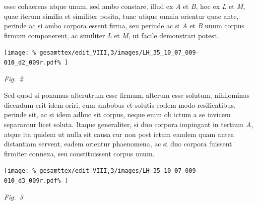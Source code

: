 %
esse cohaerens%
\protect{}
atque unum,%
\protect{}
sed ambo constare,
illud ex \textit{A} et \textit{B},
hoc ex \textit{L} et \textit{M},
quae iterum similia et similiter posita,%
\protect{}
tunc utique omnia orientur %
quae ante,
perinde ac si ambo corpora essent firma,%
\protect{}
seu perinde ac si \textit{A} et \textit{B}
unum corpus firmum componerent,
ac similiter \textit{L} et \textit{M},
ut facile demonstrari potest.
\pend%
%
%
\vspace{1.0em} %
\centerline{%
\texttt{[image: \%
gesamttex/edit\_VIII,3/images/LH\_35\_10\_07\_009-010\_d2\_009r.pdf\%
]}}
\vspace{0.5em}
\centerline{%
\lbrack\textit{Fig.~2}\rbrack%
\label{LH_35_10_07_009r_Fig.2}%
}
\vspace{1.0em}
%
\pstart%
Sed quod si ponamus
alterutrum esse firmum,%
\protect{}
alterum esse solutum,%
\protect{}
nihilominus dicendum erit
idem oriri,
cum ambobus et solutis
eodem modo resilientibus,%
\protect{}
perinde sit,
ac si idem adhuc sit corpus,
neque enim ob ictum%
\protect{}
a se invicem separantur licet soluta.%
\protect{}
Itaque generaliter,
si duo corpora
%
%
impingant in tertium \textit{A},%
\protect{}
atque ita quidem ut nulla sit causa%
\protect{}
cur non post ictum%
\protect{}
eandem quam antea distantiam servent,%
\protect{}%
\protect{}
eadem orientur phaenomena,%
\protect{}
ac si duo corpora fuissent firmiter connexa,%
\protect{}
seu constituissent corpus unum.%
\protect{}
\pend%
\newpage
%
%
\vspace{1.0em} %
\centerline{%
\texttt{[image: \%
gesamttex/edit\_VIII,3/images/LH\_35\_10\_07\_009-010\_d3\_009r.pdf\%
]}}
\vspace{0.3em}
\centerline{%
\lbrack\textit{Fig.~3}\rbrack%
}
\vspace{1.0em}
